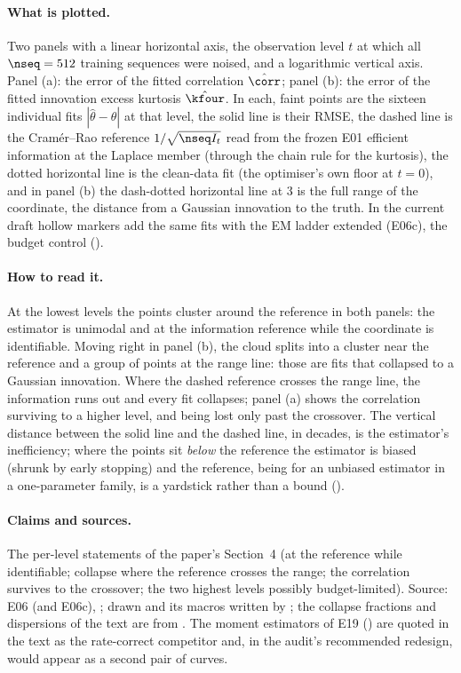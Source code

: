 \paragraph{What is plotted.} Two panels with a linear horizontal axis, the observation
level $t$ at which all $\nseq=512$ training sequences were noised, and a logarithmic
vertical axis. Panel (a): the error of the fitted correlation $\hat\corr$; panel (b):
the error of the fitted innovation excess kurtosis $\hat\kfour$. In each, faint points
are the sixteen individual fits $|\hat\theta-\theta|$ at that level, the solid line is
their RMSE, the dashed line is the Cram\'er--Rao reference $1/\sqrt{\nseq I_t}$ read from
the frozen E01 efficient information at the Laplace member (through the chain rule for
the kurtosis), the dotted horizontal line is the clean-data fit (the optimiser's own
floor at $t=0$), and in panel (b) the dash-dotted horizontal line at $3$ is the full range
of the coordinate, the distance from a Gaussian innovation to the truth. In the current
draft hollow markers add the same fits with the EM ladder extended (E06c), the budget
control ().

\paragraph{How to read it.} At the lowest levels the points cluster around the reference
in both panels: the estimator is unimodal and at the information reference while the
coordinate is identifiable. Moving right in panel (b), the cloud splits into a cluster
near the reference and a group of points at the range line: those are fits that
collapsed to a Gaussian innovation. Where the dashed reference crosses the range line,
the information runs out and every fit collapses; panel (a) shows the correlation
surviving to a higher level, and being lost only past the crossover. The vertical
distance between the solid line and the dashed line, in decades, is the estimator's
inefficiency; where the points sit \emph{below} the reference the estimator is biased
(shrunk by early stopping) and the reference, being for an unbiased estimator in a
one-parameter family, is a yardstick rather than a bound ().

\paragraph{Claims and sources.} The per-level statements of the paper's Section~4 (at
the reference while identifiable; collapse where the reference crosses the range; the
correlation survives to the crossover; the two highest levels possibly budget-limited).
Source: E06 (and E06c), ; drawn and its macros written by
; the collapse fractions and dispersions of the
text are from . The moment estimators of E19
() are quoted in the text as the rate-correct
competitor and, in the audit's recommended redesign, would appear as a second pair of
curves.

